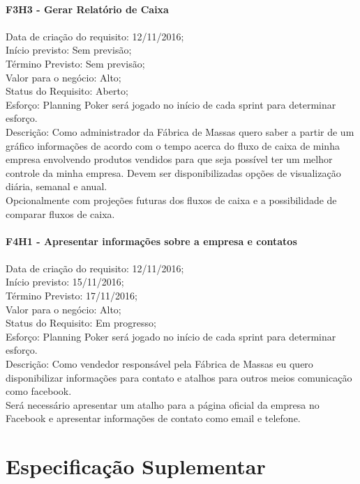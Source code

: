 \begin{apendicesenv}
\\
\textbf{F3H3 - Gerar Relatório de Caixa}\\ \\
\tab Data de criação do requisito: 12/11/2016;\\
\tab Início previsto: Sem previsão;\\
\tab Término Previsto: Sem previsão;\\
\tab Valor para o negócio: Alto;\\
\tab Status do Requisito: Aberto;\\
\tab Esforço: Planning Poker será jogado no início de cada sprint para determinar esforço.\\
\tab Descrição: Como administrador da Fábrica de Massas quero saber a partir de um gráfico informações de acordo com o tempo acerca do fluxo de caixa de minha empresa envolvendo produtos vendidos para que seja possível ter um melhor controle da minha empresa. Devem ser disponibilizadas opções de visualização diária, semanal e anual.\\
\tab Opcionalmente com projeções futuras dos fluxos de caixa e a possibilidade de comparar fluxos de caixa.\\
\\
\textbf{F4H1 - Apresentar informações sobre a empresa e contatos}\\ \\
\tab Data de criação do requisito: 12/11/2016;\\
\tab Início previsto: 15/11/2016;\\
\tab Término Previsto: 17/11/2016;\\
\tab Valor para o negócio: Alto;\\
\tab Status do Requisito: Em progresso;\\
\tab Esforço: Planning Poker será jogado no início de cada sprint para determinar esforço.\\
\tab Descrição: Como vendedor responsável pela Fábrica de Massas eu quero disponibilizar informações para contato e atalhos para outros meios comunicação como facebook.\\
\tab Será necessário apresentar um atalho para a página oficial da empresa no Facebook e apresentar informações de contato como email e telefone.\\

\chapter{Especificação Suplementar}
\label{Suplementar}


\end{apendicesenv}
